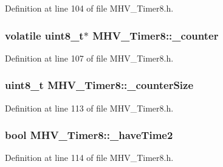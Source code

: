 \-Definition at line 104 of file \-M\-H\-V\-\_\-\-Timer8.\-h.

\hypertarget{class_m_h_v___timer8_ae99499e5828be6ed0c312cd43821a7c3}{
\subsubsection[{\-\_\-counter}]{\setlength{\rightskip}{0pt plus 5cm}volatile uint8\-\_\-t$\ast$ {\bf \-M\-H\-V\-\_\-\-Timer8\-::\-\_\-counter}}}
\label{class_m_h_v___timer8_ae99499e5828be6ed0c312cd43821a7c3}


\-Definition at line 107 of file \-M\-H\-V\-\_\-\-Timer8.\-h.

\hypertarget{class_m_h_v___timer8_a25827d35452ab31f1f0e1beb232a259b}{
\subsubsection[{\-\_\-counter\-Size}]{\setlength{\rightskip}{0pt plus 5cm}uint8\-\_\-t {\bf \-M\-H\-V\-\_\-\-Timer8\-::\-\_\-counter\-Size}}}
\label{class_m_h_v___timer8_a25827d35452ab31f1f0e1beb232a259b}


\-Definition at line 113 of file \-M\-H\-V\-\_\-\-Timer8.\-h.

\hypertarget{class_m_h_v___timer8_adffeb4bbdd699814b5d0abd9cf59b3a9}{
\subsubsection[{\-\_\-have\-Time2}]{\setlength{\rightskip}{0pt plus 5cm}bool {\bf \-M\-H\-V\-\_\-\-Timer8\-::\-\_\-have\-Time2}}}
\label{class_m_h_v___timer8_adffeb4bbdd699814b5d0abd9cf59b3a9}


\-Definition at line 114 of file \-M\-H\-V\-\_\-\-Timer8.\-h.

